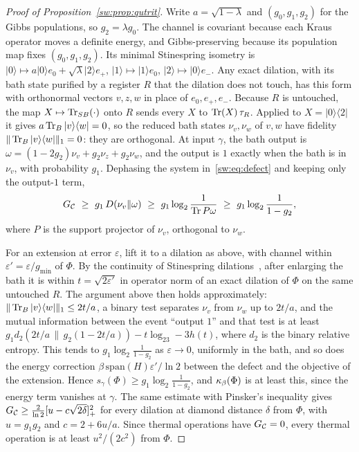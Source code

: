 \begin{proof}[Proof of Proposition~\ref{sw:prop:qutrit}]
Write $a=\sqrt{1-\lambda}$ and $(g_0,g_1,g_2)$ for the Gibbs populations, so $g_2=\lambda g_0$. The channel is covariant because each Kraus operator moves a definite energy, and Gibbs-preserving because its population map fixes $(g_0,g_1,g_2)$. Its minimal Stinespring isometry is $|0\rangle\mapsto a|0\rangle e_0+\sqrt\lambda|2\rangle e_+$, $|1\rangle\mapsto|1\rangle e_0$, $|2\rangle\mapsto|0\rangle e_-$. Any exact dilation, with its bath state purified by a register $R$ that the dilation does not touch, has this form with orthonormal vectors $v,z,w$ in place of $e_0,e_+,e_-$. Because $R$ is untouched, the map $X\mapsto\operatorname{Tr}_{SB}(\cdot)$ onto $R$ sends every $X$ to $\operatorname{Tr}(X)\,\tau_R$. Applied to $X=|0\rangle\langle2|$ it gives $a\operatorname{Tr}_B|v\rangle\langle w|=0$, so the reduced bath states $\nu_v,\nu_w$ of $v,w$ have fidelity $\|\operatorname{Tr}_B|v\rangle\langle w|\|_1=0$: they are orthogonal. At input $\gamma$, the bath output is $\omega=(1-2g_2)\nu_v+g_2\nu_z+g_2\nu_w$, and the output is $1$ exactly when the bath is in $\nu_v$, with probability $g_1$. Dephasing the system in~\eqref{sw:eq:defect} and keeping only the output-$1$ term,
\[
G_{\Dil}\ \ge\ g_1\,D(\nu_v\|\omega)\ \ge\ g_1\log_2\frac1{\Tr P\omega}\ \ge\ g_1\log_2\frac1{1-g_2},
\]
where $P$ is the support projector of $\nu_v$, orthogonal to $\nu_w$.

For an extension at error $\varepsilon$, lift it to a dilation as above, with channel within $\varepsilon'=\varepsilon/g_{\min}$ of $\Phi$. By the continuity of Stinespring dilations~\cite{KSW08}, after enlarging the bath it is within $t=\sqrt{2\varepsilon'}$ in operator norm of an exact dilation of $\Phi$ on the same untouched $R$. The argument above then holds approximately: $\|\operatorname{Tr}_B|v\rangle\langle w|\|_1\le2t/a$, a binary test separates $\nu_v$ from $\nu_w$ up to $2t/a$, and the mutual information between the event ``output $1$'' and that test is at least $g_1d_2(2t/a\,\|\,g_2(1-2t/a))-t\log_23-3h(t)$, where $d_2$ is the binary relative entropy. This tends to $g_1\log_2\frac1{1-g_2}$ as $\varepsilon\to0$, uniformly in the bath, and so does the energy correction $\beta\,\mathrm{span}(H)\varepsilon'/\ln2$ between the defect and the objective of the extension. Hence $s_\gamma(\Phi)\ge g_1\log_2\frac1{1-g_2}$, and $\kappa_\beta(\Phi)$ is at least this, since the energy term vanishes at $\gamma$. The same estimate with Pinsker's inequality gives $G_{\mathcal C}\ge\frac2{\ln2}[u-c\sqrt{2\delta}]_+^2$ for every dilation at diamond distance $\delta$ from $\Phi$, with $u=g_1g_2$ and $c=2+6u/a$. Since thermal operations have $G_{\mathcal C}=0$, every thermal operation is at least $u^2/(2c^2)$ from $\Phi$.
\end{proof}

